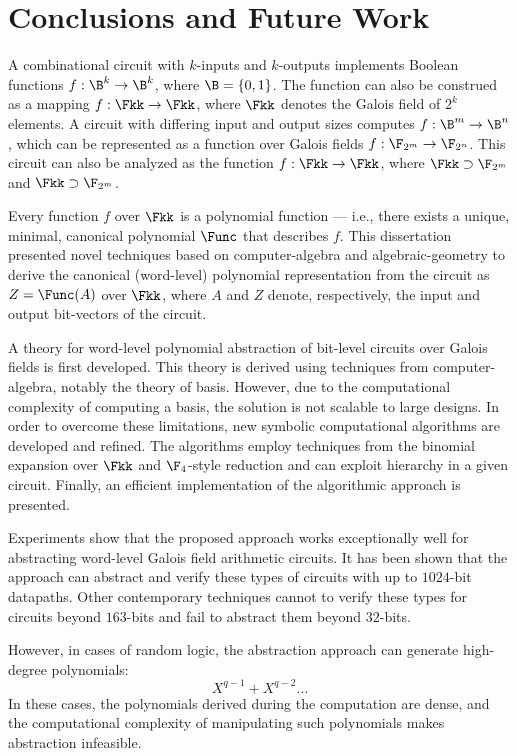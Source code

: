 \chapter{Conclusions and Future Work}
\label{ch:concl}

A combinational circuit with $k$-inputs and $k$-outputs implements
Boolean functions  $f: \B ^k \rightarrow \B ^k$, where $\B = \{0,
1\}$. The function can also be construed as a mapping  $f: \Fkk
\rightarrow \Fkk$, where $\Fkk$ denotes the Galois field of
$2^k$ elements. A circuit with differing input and output sizes 
computes $f: \B ^m \rightarrow \B ^n$, which can be represented
as a function over Galois fields $f: \F_{2^m} \rightarrow \F_{2^n}$.
This circuit can also be analyzed as the function 
$f: \Fkk \rightarrow \Fkk$, where $\Fkk \supset \F_{2^m}$ 
and $\Fkk \supset \F_{2^m}$.

Every function $f$ over $\Fkk$ is a polynomial
function --- i.e., there exists a unique,  minimal, canonical
polynomial $\Func$ that describes $f$. This dissertation presented novel
techniques based on computer-algebra and algebraic-geometry to
derive the canonical (word-level) polynomial representation from the
circuit as  $Z = \Func(A)$ over $\Fkk$, where $A$ and $Z$ denote, 
respectively, the input and output bit-vectors of the circuit.

A theory for word-level polynomial abstraction of bit-level circuits 
over Galois fields is first developed.
This theory is derived using techniques from computer-algebra, notably the theory of
\Grobner basis. However, due to the computational complexity of computing a \Grobner
basis, the solution is not scalable to large designs.
In order to overcome these limitations, new symbolic computational
algorithms are developed and refined. The algorithms employ techniques
from the binomial expansion over $\Fkk$ and $\F_4$-style reduction and can exploit
hierarchy in a given circuit. Finally, an efficient implementation of the algorithmic
approach is presented.

Experiments show that the proposed approach works exceptionally well
for abstracting word-level Galois field arithmetic circuits. It has been
shown that the approach can abstract and verify these types of circuits with up to 
$1024$-bit datapaths. Other contemporary techniques
cannot to verify these types for circuits beyond $163$-bits and fail to
abstract them beyond $32$-bits.

However, in cases of random logic, the abstraction approach
can generate high-degree polynomials:
\begin{equation}
X^{q-1}+X^{q-2}\dots
\end{equation}
In these cases, the polynomials derived during the computation are dense, 
and the computational complexity of manipulating such polynomials
makes abstraction infeasible.

